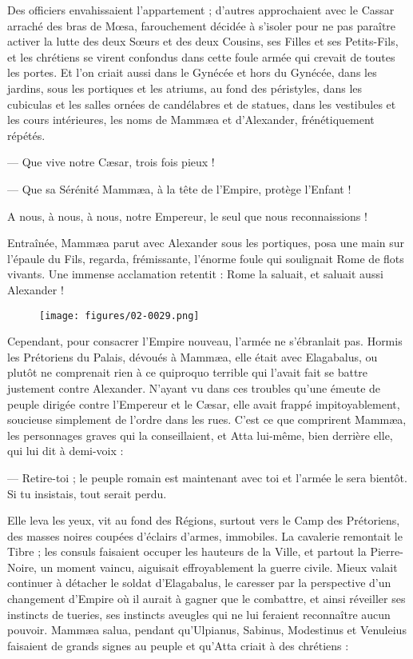 \documentclass[a4paper, 11pt, oneside, polutonikogreek, french]{article}
\begin{document}
Des officiers envahissaient l'appartement ; d'autres approchaient avec le Cassar arraché des bras de Mœsa, farouchement décidée à s'isoler pour ne pas paraître activer la lutte des deux Sœurs et des deux Cousins, ses Filles et ses Petits-Fils, et les chrétiens se virent confondus dans cette foule armée qui crevait de toutes les portes. Et l'on criait aussi dans le Gynécée et hors du Gynécée, dans les jardins, sous les portiques et les atriums, au fond des péristyles, dans les cubiculas et les salles ornées de candélabres et de statues, dans les vestibules et les cours intérieures, les noms de Mammæa et d'Alexander, frénétiquement répétés.

--- Que vive notre Cæsar, trois fois pieux !

--- Que sa Sérénité Mammæa, à la tête de l'Empire, protège l'Enfant !

A nous, à nous, à nous, notre Empereur, le seul que nous reconnaissions !

Entraînée, Mammæa parut avec Alexander sous les portiques, posa une main sur l'épaule du Fils, regarda, frémissante, l'énorme foule qui soulignait Rome de flots vivants. Une immense acclamation retentit : Rome la saluait, et saluait aussi Alexander !
\begin{figure}[H]
\centering
\texttt{[image: figures/02-0029.png]}
\end{figure}
Cependant, pour consacrer l'Empire nouveau, l'armée ne s'ébranlait pas. Hormis les Prétoriens du Palais, dévoués à Mammæa, elle était avec Elagabalus, ou plutôt ne comprenait rien à ce quiproquo terrible qui l'avait fait se battre justement contre Alexander. N'ayant vu dans ces troubles qu'une émeute de peuple dirigée contre l'Empereur et le Cæsar, elle avait frappé impitoyablement, soucieuse simplement de l'ordre dans les rues. C'est ce que comprirent Mammæa, les personnages graves qui la conseillaient, et Atta lui-même, bien derrière elle, qui lui dit à demi-voix :

--- Retire-toi ; le peuple romain est maintenant avec toi et l'armée le sera bientôt. Si tu insistais, tout serait perdu.

Elle leva les yeux, vit au fond des Régions, surtout vers le Camp des Prétoriens, des masses noires coupées d'éclairs d'armes, immobiles. La cavalerie remontait le Tibre ; les consuls faisaient occuper les hauteurs de la Ville, et partout la Pierre-Noire, un moment vaincu, aiguisait effroyablement la guerre civile. Mieux valait continuer à détacher le soldat d'Elagabalus, le caresser par la perspective d'un changement d'Empire où il aurait à gagner que le combattre, et ainsi réveiller ses instincts de tueries, ses instincts aveugles qui ne lui feraient reconnaître aucun pouvoir. Mammæa salua, pendant qu'Ulpianus, Sabinus, Modestinus et Venuleius faisaient de grands signes au peuple et qu'Atta criait à des chrétiens :
\end{document}
